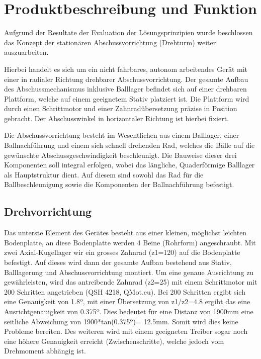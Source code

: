 \section{Produktbeschreibung und Funktion}

Aufgrund der Resultate der Evaluation der Lösungsprinzipien wurde beschlossen 
das Konzept der stationären Abschussvorrichtung (Drehturm) weiter 
auszuarbeiten. 

Hierbei handelt es sich um ein nicht fahrbares, autonom arbeitendes Gerät mit 
einer in radialer Richtung drehbarer Abschussvorrichtung. Der gesamte Aufbau 
des Abschussmechanismus inklusive Balllager befindet sich auf einer drehbaren 
Plattform, welche auf einem geeignetem Stativ platziert ist. Die Plattform 
wird durch einen Schrittmotor und einer Zahnradübersetzung präzise in Position 
gebracht. Der Abschusswinkel in horizontaler Richtung ist hierbei fixiert. 

Die Abschussvorrichtung besteht im Wesentlichen aus einem Balllager, einer 
Ballnachführung und einem sich schnell drehenden Rad, welches die Bälle auf 
die gewünschte Abschussgeschwindigkeit beschleunigt. Die Bauweise dieser drei 
Komponenten soll integral erfolgen, wobei das längliche, Quaderförmige 
Balllager als Hauptstruktur dient. Auf diesem sind sowohl das Rad für die 
Ballbeschleunigung sowie die Komponenten der Ballnachführung befestigt.

\subsection{Drehvorrichtung}
Das unterste Element des Gerätes besteht aus einer kleinen, möglichst leichten Bodenplatte, an diese Bodenplatte werden 4 Beine (Rohrform) angeschraubt. Mit zwei Axial-Kugellager wir ein grosses Zahnrad (z1=120) auf die Bodenplatte befestigt. Auf dieses wird dann der gesamte Aufbau bestehend aus Stativ, Balllagerung und Abschussvorrichtung montiert. Um eine genaue Ausrichtung zu gewährleisten, wird das antreibende Zahnrad (z2=25) mit einem Schrittmotor mit 200 Schritten angetrieben (QSH 4218, QMot.eu). Bei 200 Schritten ergibt sich eine Genauigkeit von 1.8º, mit einer Übersetzung von z1/z2=4.8 ergibt das eine Ausrichtgenauigkeit von 0.375º. Dies bedeutet für eine Distanz von 1900mm eine seitliche Abweichung von 1900*tan(0.375º)= 12.5mm. Somit wird dies keine Probleme bereiten. Des weiteren wird mit einem geeigneten Treiber sogar noch eine höhere Genauigkeit erreicht (Zwischenschritte), welche jedoch vom Drehmoment abhängig ist. 

